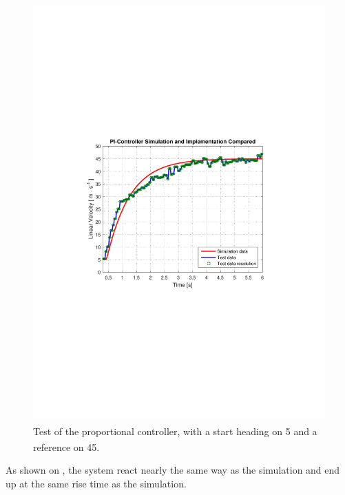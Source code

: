 \begin{figure}[H]
 	\centering
 	\includegraphics[width=\textwidth]{figures/SteeringAngularTest}
 	\caption{Test of the proportional controller, with a start heading on \si{5^{\circ}} and a reference on \si{45^{\circ}}.}
 	\label{fig:AngularTestSim}
\end{figure}

As shown on , the system react nearly the same way as the simulation and end up at the same rise time as the simulation. 